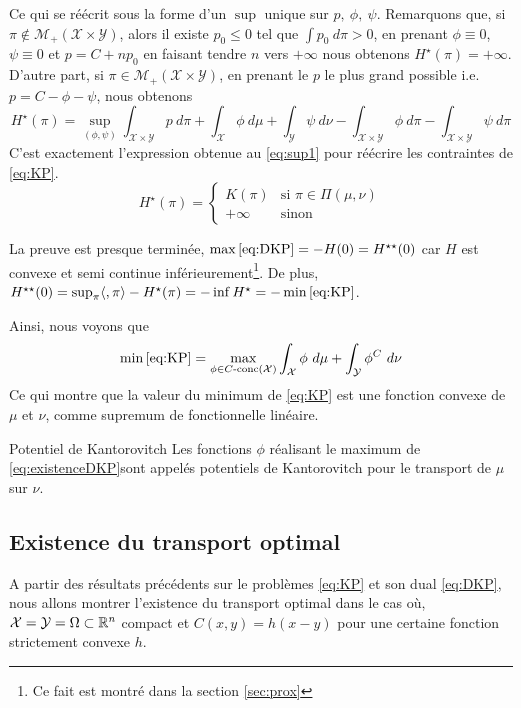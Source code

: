 \documentclass[a4paper,12pt]{article}
\begin{document}
\begin{preuve}
$$$$
Ce qui se réécrit sous la forme d'un $\sup$ unique sur $p,\ \phi,\ \psi$. Remarquons que, si $\pi\notin\mathcal{M}_+(\mathcal{X}\times\mathcal{Y})$, alors il existe $p_0\leq 0$ tel que $\int p_0\ d\pi >0$, en prenant $\phi\equiv 0$, $\psi\equiv 0$ et $p=C+np_0$ en faisant tendre $n$ vers $+\infty$ nous obtenons $H^{\star}(\pi)=+\infty$. D'autre part, si $\pi\in\mathcal{M}_+(\mathcal{X}\times\mathcal{Y})$, en prenant le $p$ le plus grand possible i.e. $p=C-\phi-\psi$, nous obtenons 
$$
H^{\star}(\pi)=  \sup_{(\phi,\psi)} \int_{\mathcal{X}\times\mathcal{Y}} p\ d\pi + \int_{\mathcal{X}}\phi\ d\mu + \int_{\mathcal{Y}}\psi\ d\nu - \int_{\mathcal{X}\times\mathcal{Y}} \phi\ d\pi -\int_{\mathcal{X}\times\mathcal{Y}} \psi\ d\pi
$$
C'est exactement l'expression obtenue au \eqref{eq:sup1} pour réécrire les contraintes de \eqref{eq:KP}. 
$$
H^{\star}(\pi)=\left\{
\begin{array}{cl}
K(\pi) & \text{si } \pi \in\Pi(\mu,\nu)\\
+\infty & \text{sinon}
\end{array}
\right.
$$

La preuve est presque terminée, $\max\eqref{eq:DKP} = -H(0) = H^{\star\star}(0)$ car $H$ est convexe et semi continue inférieurement\footnote{Ce fait est montré dans la section \ref{sec:prox}}. De plus, $H^{\star\star}(0)=\sup_{\pi}\langle 
,\pi\rangle-H^{\star}(\pi)=-\inf H^{\star}=-\min\eqref{eq:KP}$.
\end{preuve}

Ainsi, nous voyons que 
$$
\min\eqref{eq:KP}= \max_{\phi\in C\text{-conc}(\mathcal{X})}\int_{\mathcal{X}}\phi\ d\mu +\int_{\mathcal{Y}} \phi^C\ d\nu
$$
Ce qui montre que la valeur du minimum de \eqref{eq:KP} est une fonction convexe de $\mu$ et $\nu$, comme supremum de fonctionnelle linéaire. 
\begin{definition}{Potentiel de Kantorovitch}
Les fonctions $\phi$ réalisant le maximum de \eqref{eq:existenceDKP}sont appelés potentiels de Kantorovitch pour le transport de $\mu$ sur $\nu$.
\end{definition}

\subsection{Existence du transport optimal}

A partir des résultats précédents sur le problèmes \eqref{eq:KP} et son dual \eqref{eq:DKP}, nous allons montrer l'existence du transport optimal dans le cas où, $\mathcal{X}=\mathcal{Y}=\Omega\subset\mathbb{R}^n$ compact et $C(x,y)=h(x-y)$ pour une certaine fonction strictement convexe $h$. 
\end{document}
